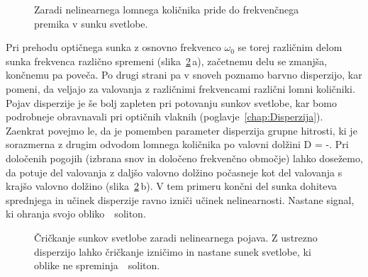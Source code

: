 \begin{figure}[h]
\centering
\def\svgwidth{80truemm} 

\caption{Zaradi nelinearnega lomnega količnika pride do frekvenčnega premika v sunku svetlobe.}
\label{fig:optsoliton}
\end{figure}
Pri prehodu optičnega sunka z osnovno frekvenco $\omega_0$ se torej različnim delom sunka
frekvenca različno spremeni (slika~\ref{fig:chirp}\,a), začetnemu delu se zmanjša, 
končnemu pa poveča. Po drugi strani pa v snoveh poznamo barvno disperzijo, 
kar pomeni, da veljajo za valovanja z različnimi frekvencami različni lomni količniki.
 Pojav disperzije je še bolj zapleten pri potovanju sunkov svetlobe,
kar bomo podrobneje obravnavali pri optičnih vlaknih (poglavje~\ref{chap:Disperzija}).
Zaenkrat povejmo le, da je pomemben parameter disperzija grupne hitrosti, ki je sorazmerna
z drugim odvodom lomnega količnika po valovni dolžini 
\beq
D = -.
\eeq
Pri določenih pogojih (izbrana snov in določeno frekvenčno območje) 
lahko dosežemo, da potuje del valovanja z daljšo valovno dolžino počasneje kot del valovanja
s krajšo valovno dolžino (slika~\ref{fig:chirp}\,b). V tem primeru končni del sunka 
dohiteva sprednjega in učinek disperzije ravno izniči učinek nelinearnosti. 
Nastane signal, ki ohranja svojo obliko~\textendash~soliton. 
\begin{figure}[h]
\centering
\def\svgwidth{120truemm} 

\caption{Čričkanje sunkov svetlobe zaradi nelinearnega pojava. Z ustrezno disperzijo lahko
čričkanje izničimo in nastane sunek svetlobe, ki oblike ne spreminja~\textendash~soliton.}
\label{fig:chirp}
\end{figure}

